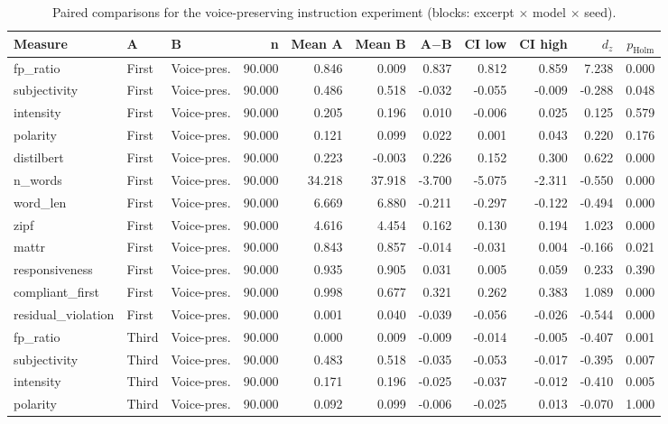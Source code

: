\documentclass[10pt]{article}
\begin{document}
{\scriptsize
\begin{longtable}{lllrrrrrrrr}
\caption{Paired comparisons for the voice-preserving instruction experiment (blocks: excerpt $\times$ model $\times$ seed).}\\
\toprule
Measure & A & B & n & Mean A & Mean B & A$-$B & CI low & CI high & $d_z$ & $p_\mathrm{Holm}$ \\
\midrule
\endhead
fp\_ratio & First & Voice-pres. & 90.000 & 0.846 & 0.009 & 0.837 & 0.812 & 0.859 & 7.238 & 0.000 \\
subjectivity & First & Voice-pres. & 90.000 & 0.486 & 0.518 & -0.032 & -0.055 & -0.009 & -0.288 & 0.048 \\
intensity & First & Voice-pres. & 90.000 & 0.205 & 0.196 & 0.010 & -0.006 & 0.025 & 0.125 & 0.579 \\
polarity & First & Voice-pres. & 90.000 & 0.121 & 0.099 & 0.022 & 0.001 & 0.043 & 0.220 & 0.176 \\
distilbert & First & Voice-pres. & 90.000 & 0.223 & -0.003 & 0.226 & 0.152 & 0.300 & 0.622 & 0.000 \\
n\_words & First & Voice-pres. & 90.000 & 34.218 & 37.918 & -3.700 & -5.075 & -2.311 & -0.550 & 0.000 \\
word\_len & First & Voice-pres. & 90.000 & 6.669 & 6.880 & -0.211 & -0.297 & -0.122 & -0.494 & 0.000 \\
zipf & First & Voice-pres. & 90.000 & 4.616 & 4.454 & 0.162 & 0.130 & 0.194 & 1.023 & 0.000 \\
mattr & First & Voice-pres. & 90.000 & 0.843 & 0.857 & -0.014 & -0.031 & 0.004 & -0.166 & 0.021 \\
responsiveness & First & Voice-pres. & 90.000 & 0.935 & 0.905 & 0.031 & 0.005 & 0.059 & 0.233 & 0.390 \\
compliant\_first & First & Voice-pres. & 90.000 & 0.998 & 0.677 & 0.321 & 0.262 & 0.383 & 1.089 & 0.000 \\
residual\_violation & First & Voice-pres. & 90.000 & 0.001 & 0.040 & -0.039 & -0.056 & -0.026 & -0.544 & 0.000 \\
fp\_ratio & Third & Voice-pres. & 90.000 & 0.000 & 0.009 & -0.009 & -0.014 & -0.005 & -0.407 & 0.001 \\
subjectivity & Third & Voice-pres. & 90.000 & 0.483 & 0.518 & -0.035 & -0.053 & -0.017 & -0.395 & 0.007 \\
intensity & Third & Voice-pres. & 90.000 & 0.171 & 0.196 & -0.025 & -0.037 & -0.012 & -0.410 & 0.005 \\
polarity & Third & Voice-pres. & 90.000 & 0.092 & 0.099 & -0.006 & -0.025 & 0.013 & -0.070 & 1.000 \\

\end{longtable}}
\end{document}
